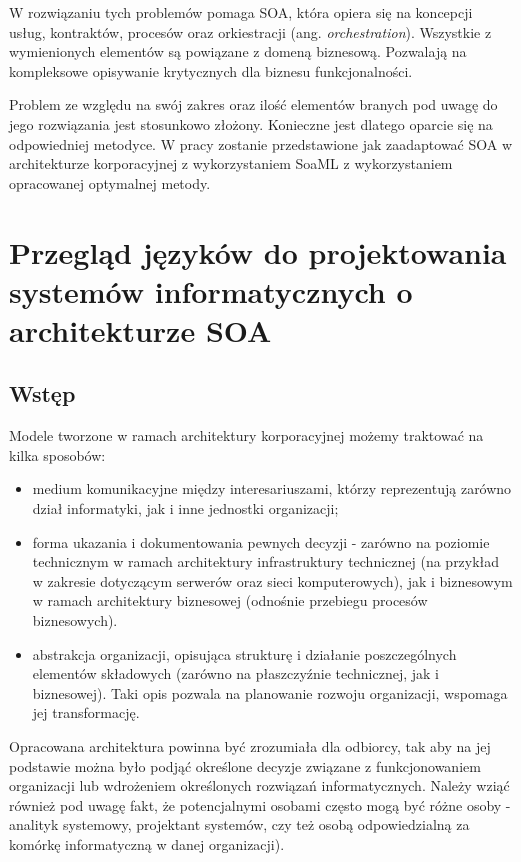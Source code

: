 W rozwiązaniu tych problemów pomaga SOA, która opiera się na koncepcji usług, kontraktów, procesów oraz orkiestracji (ang. \emph{orchestration}). Wszystkie z wymienionych elementów są powiązane z domeną biznesową. Pozwalają na kompleksowe opisywanie krytycznych dla biznesu funkcjonalności. 

Problem ze względu na swój zakres oraz ilość elementów branych pod uwagę do jego rozwiązania jest stosunkowo złożony. Konieczne jest dlatego oparcie się na odpowiedniej metodyce. W pracy zostanie przedstawione jak zaadaptować SOA w architekturze korporacyjnej z wykorzystaniem SoaML z wykorzystaniem opracowanej optymalnej metody.

\chapter{Przegląd języków do projektowania systemów informatycznych o architekturze SOA}

\section{Wstęp}
Modele tworzone w ramach architektury korporacyjnej możemy traktować na kilka sposobów:
\begin{itemize}
\item{medium komunikacyjne między interesariuszami, którzy reprezentują zarówno dział informatyki, jak i inne jednostki organizacji;}
\item{forma ukazania i dokumentowania pewnych decyzji - zarówno na poziomie technicznym w ramach architektury infrastruktury technicznej (na przykład w zakresie dotyczącym serwerów oraz sieci komputerowych), jak i biznesowym w ramach architektury biznesowej (odnośnie przebiegu procesów biznesowych).}
\item{abstrakcja organizacji, opisująca strukturę i działanie poszczególnych elementów składowych (zarówno na płaszczyźnie technicznej, jak i biznesowej). Taki opis pozwala na planowanie rozwoju organizacji, wspomaga jej transformację.}
\end{itemize}

Opracowana architektura powinna być zrozumiała dla odbiorcy, tak aby na jej podstawie można było podjąć określone decyzje związane z funkcjonowaniem organizacji lub wdrożeniem określonych rozwiązań informatycznych. Należy wziąć również pod uwagę fakt, że potencjalnymi osobami często mogą być różne osoby - analityk systemowy, projektant systemów, czy też osobą odpowiedzialną za komórkę informatyczną w danej organizacji). \cite{ArchKorpSob}


